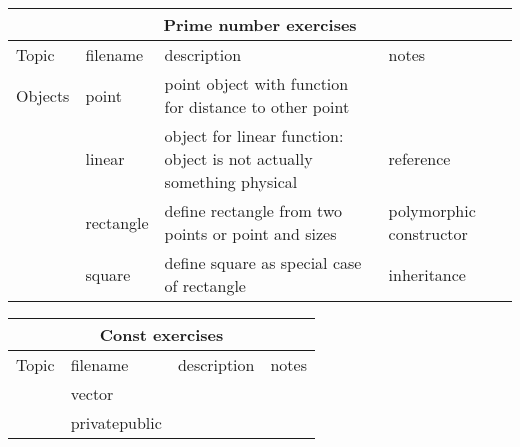 \begin{landscape}
  \begin{tabular}{|l|l|p{3in}|p{3in}|}
    \hline
    \multicolumn{4}{|c|}{Prime number exercises}\\
    \hline
    Topic&filename&description&notes\\
    \hline
    \hline
    Objects&point&point object with function for distance to other
    point
    &\n{math.h}\\
    \hline
    &linear&object for linear function: object is not actually
    something physical
    &reference\\
    \hline
    &rectangle&define rectangle from two points or point and sizes
    &polymorphic constructor\\
    \hline
    &square&define square as special case of rectangle
    &inheritance\\
    \hline
  \end{tabular}
\end{landscape}

\begin{landscape}
  \begin{tabular}{|l|l|p{3in}|p{3in}|}
    \hline
    \multicolumn{4}{|c|}{Const exercises}\\
    \hline
    Topic&filename&description&notes\\
    \hline
    \hline
    &vector&&\\
    &privatepublic&&\\
    \hline
  \end{tabular}
\end{landscape}
